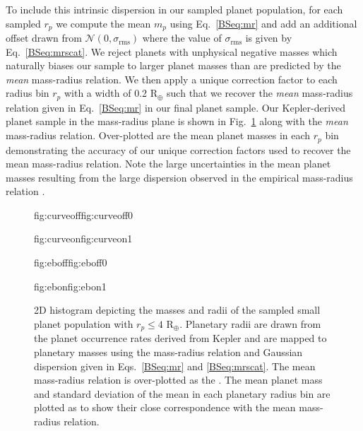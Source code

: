 \noindent To include this intrinsic dispersion in our sampled planet population, for each sampled $r_p$
we compute the mean $m_p$ using Eq.~\ref{BSeq:mr} and add an additional offset drawn from
$\mathcal{N}(0,\sigma_{\text{rms}})$
where the value of $\sigma_{\text{rms}}$ is given by Eq.~\ref{BSeq:mrscat}. We reject planets with unphysical
negative masses
which naturally biases our sample to larger planet masses than are predicted by the \emph{mean} mass-radius
relation. We then apply a unique correction factor to each radius bin $r_p$ with a width of 0.2 R$_{\oplus}$
such that we recover the \emph{mean} mass-radius relation given in Eq.~\ref{BSeq:mr} in our final planet sample.
Our Kepler-derived planet sample in the mass-radius plane is shown in Fig.~\ref{BSfig:mr} along with the 
\emph{mean} mass-radius relation. Over-plotted are the mean planet masses in each $r_p$ bin demonstrating the
accuracy of our unique correction factors used to recover the mean mass-radius relation. Note the large
uncertainties in the mean planet masses resulting from the large dispersion observed in the empirical mass-radius
relation \citep{weiss14}.

\begin{figure}
  \centering
  \hspace{-\hsize}%
  \begin{ocg}{fig:curveoff}{fig:curveoff}{0}%
  \end{ocg}%
  \begin{ocg}{fig:curveon}{fig:curveon}{1}%
  \end{ocg}
  \hspace{-\hsize}%
  \begin{ocg}{fig:eboff}{fig:eboff}{0}%
  \end{ocg}%
  \begin{ocg}{fig:ebon}{fig:ebon}{1}%
  \end{ocg}
  \hspace{-\hsize}%
  \caption{2D histogram depicting the masses and radii of the sampled
    small planet population with $r_p \leq 4$ R$_{\oplus}$. Planetary radii are drawn from the
    planet occurrence rates derived from Kepler and are mapped to 
    planetary masses using the mass-radius relation and Gaussian
    dispersion given in Eqs.~\ref{BSeq:mr} and \ref{BSeq:mrscat}. The mean
    mass-radius relation is over-plotted as the 
    . The mean
    planet mass and standard deviation of the mean in each planetary radius bin are plotted as
     to
    show their close correspondence with the mean mass-radius relation.}
  \label{BSfig:mr}
\end{figure}

